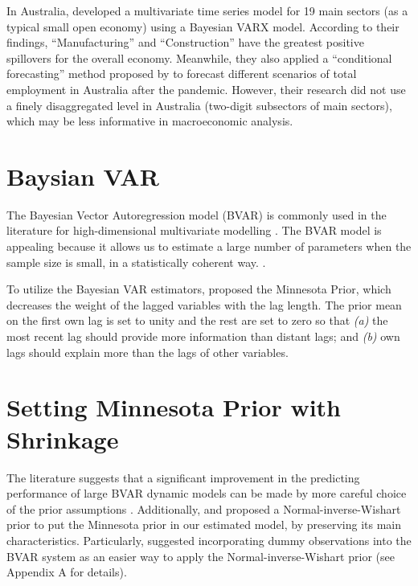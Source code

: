 \documentclass{monashthesis}
\begin{document}
In Australia, \textcite{anderson2020} developed a multivariate time series model for 19 main sectors (as a typical small open economy) using a Bayesian VARX model. According to their findings, ``Manufacturing'' and ``Construction'' have the greatest positive spillovers for the overall economy. Meanwhile, they also applied a ``conditional forecasting'' method proposed by \textcite{waggoner1999} to forecast different scenarios of total employment in Australia after the pandemic. However, their research did not use a finely disaggregated level in Australia (two-digit subsectors of main sectors), which may be less informative in macroeconomic analysis.

\hypertarget{baysian-var}{%
\section{Baysian VAR}\label{baysian-var}}

The Bayesian Vector Autoregression model (BVAR) is commonly used in the literature for high-dimensional multivariate modelling \autocites[e.g.][]{anderson2020,litterman1986,banbura2010large}. The BVAR model is appealing because it allows us to estimate a large number of parameters when the sample size is small, in a statistically coherent way. \autocite{litterman1986,wozniak2016bayesian}.

To utilize the Bayesian VAR estimators, \textcite{litterman1979} proposed the Minnesota Prior, which decreases the weight of the lagged variables with the lag length. The prior mean on the first own lag is set to unity and the rest are set to zero so that \emph{(a)} the most recent lag should provide more information than distant lags; and \emph{(b)} own lags should explain more than the lags of other variables.

\hypertarget{setting-minnesota-prior-with-shrinkage}{%
\section{Setting Minnesota Prior with Shrinkage}\label{setting-minnesota-prior-with-shrinkage}}

The literature suggests that a significant improvement in the predicting performance of large BVAR dynamic models can be made by more careful choice of the prior assumptions \autocite{banbura2010large,litterman1986}. Additionally, \textcite{robertson1999vector} and \textcite{kadiyala1997} proposed a Normal-inverse-Wishart prior to put the Minnesota prior in our estimated model, by preserving its main characteristics. Particularly, \textcite{banbura2010large} suggested incorporating dummy observations into the BVAR system as an easier way to apply the Normal-inverse-Wishart prior (see Appendix A for details).
\end{document}
